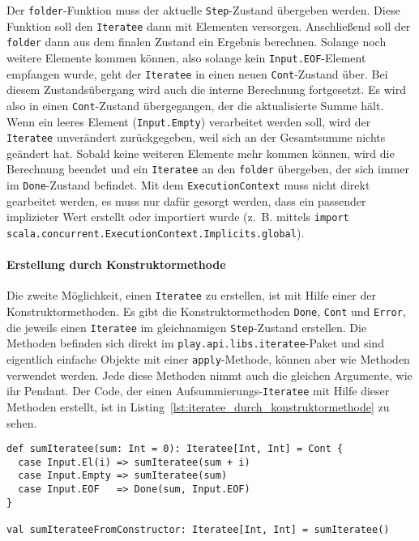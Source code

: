 Der \lstinline|folder|-Funktion muss der aktuelle \lstinline|Step|-Zustand übergeben werden.
Diese Funktion soll den \lstinline|Iteratee| dann mit Elementen versorgen.
Anschließend soll der \lstinline|folder| dann aus dem finalen Zustand ein Ergebnis berechnen.
Solange noch weitere Elemente kommen können, also solange kein \lstinline|Input.EOF|-Element empfangen wurde, geht der \lstinline|Iteratee| in einen neuen \lstinline|Cont|-Zustand über.
Bei diesem Zustandsübergang wird auch die interne Berechnung fortgesetzt.
Es wird also in einen \lstinline|Cont|-Zustand übergegangen, der die aktualisierte Summe hält.
Wenn ein leeres Element (\lstinline|Input.Empty|) verarbeitet werden soll, wird der \lstinline|Iteratee| unverändert zurückgegeben, weil sich an der Gesamtsumme nichts geändert hat.
Sobald keine weiteren Elemente mehr kommen können, wird die Berechnung beendet und ein \lstinline|Iteratee| an den \lstinline|folder| übergeben, der sich immer im \lstinline|Done|-Zustand befindet.
Mit dem \lstinline|ExecutionContext| muss nicht direkt gearbeitet werden, es muss nur dafür gesorgt werden, dass ein passender implizieter Wert erstellt oder importiert wurde (z.~B. mittels \lstinline|import scala.concurrent.ExecutionContext.Implicits.global|).


\paragraph{Erstellung durch Konstruktormethode} %
\label{par:erstellung_durch_konstruktormethode}\mbox{} %

Die zweite Möglichkeit, einen \lstinline|Iteratee| zu erstellen, ist mit Hilfe einer der Konstruktormethoden.
Es gibt die Konstruktormethoden \lstinline|Done|, \lstinline|Cont| und \lstinline|Error|, die jeweils einen \lstinline|Iteratee| im gleichnamigen \lstinline|Step|-Zustand erstellen.
Die Methoden befinden sich direkt im \lstinline|play.api.libs.iteratee|-Paket und sind eigentlich einfache Objekte mit einer \lstinline|apply|-Methode, können aber wie Methoden verwendet werden.
Jede diese Methoden nimmt auch die gleichen Argumente, wie ihr Pendant.
Der Code, der einen Aufsummierungs-\lstinline|Iteratee| mit Hilfe dieser Methoden erstellt, ist in Listing~\ref{lst:iteratee_durch_konstruktormethode} zu sehen.

\begin{lstlisting}[caption=Erstellung eines Iteratees durch eine Konstruktormethode, label=lst:iteratee_durch_konstruktormethode]
def sumIteratee(sum: Int = 0): Iteratee[Int, Int] = Cont {
  case Input.El(i) => sumIteratee(sum + i)
  case Input.Empty => sumIteratee(sum)
  case Input.EOF   => Done(sum, Input.EOF)
}

val sumIterateeFromConstructor: Iteratee[Int, Int] = sumIteratee()
\end{lstlisting}

